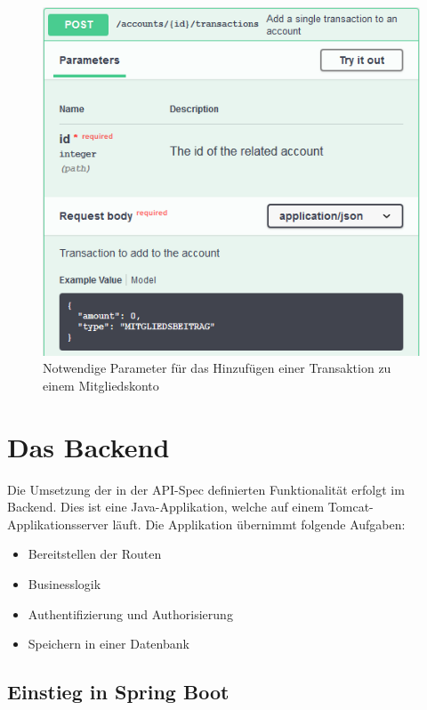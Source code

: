 \documentclass[a4paper, 11pt]{article}
\begin{document}
\begin{figure}[htpb]
    \centering
    \includegraphics{images/api_spec_example_post.png}
    \caption{Notwendige Parameter für das Hinzufügen einer Transaktion zu einem
    Mitgliedskonto}
    \label{fig:api_spec_post}
\end{figure}

\section{Das Backend}

Die Umsetzung der in der API-Spec definierten Funktionalität erfolgt im
Backend. Dies ist eine Java-Applikation, welche auf einem
Tomcat-Appli\-ka\-tions\-server läuft. Die Applikation übernimmt folgende Aufgaben:

\begin{itemize}
    \item Bereitstellen der Routen
    \item Businesslogik
    \item Authentifizierung und Authorisierung
    \item Speichern in einer Datenbank
\end{itemize}

\subsection{Einstieg in Spring Boot}
\end{document}
